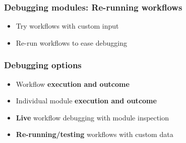\begin{frame}
    \frametitle{Debugging modules: Re-running workflows}
    \begin{itemize}
        \item Try workflows with custom input
        \item Re-run workflows to ease debugging
    \end{itemize}
    \begin{center}
    \end{center}
\end{frame}

\begin{frame}
    \frametitle{Debugging options}
    \begin{itemize}
        \item Workflow \textbf{execution and outcome}
        \item Individual module \textbf{execution and outcome}
        \item \textbf{Live} workflow debugging with module inspection
        \item \textbf{Re-running/testing} workflows with custom data
    \end{itemize}
\end{frame}

